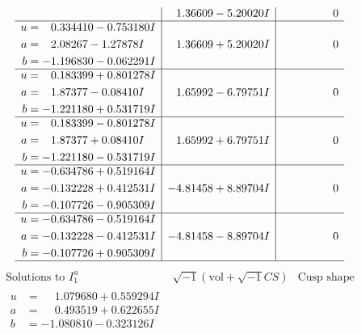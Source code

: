 \documentclass[1p]{elsarticle_modified}
\theoremstyle{definition}
\newcommand{\I}{\sqrt{-1}}
\begin{document}
$$\begin{array}{c|c|c}
 & \phantom{-}1.36609 - 5.20020 I & \phantom{-0.000000 } 0 \\ \hline\begin{aligned}
u &= \phantom{-}0.334410 - 0.753180 I \\
a &= \phantom{-}2.08267 - 1.27878 I \\
b &= -1.196830 - 0.062291 I\end{aligned}
 & \phantom{-}1.36609 + 5.20020 I & \phantom{-0.000000 } 0 \\ \hline\begin{aligned}
u &= \phantom{-}0.183399 + 0.801278 I \\
a &= \phantom{-}1.87377 - 0.08410 I \\
b &= -1.221180 + 0.531719 I\end{aligned}
 & \phantom{-}1.65992 - 6.79751 I & \phantom{-0.000000 } 0 \\ \hline\begin{aligned}
u &= \phantom{-}0.183399 - 0.801278 I \\
a &= \phantom{-}1.87377 + 0.08410 I \\
b &= -1.221180 - 0.531719 I\end{aligned}
 & \phantom{-}1.65992 + 6.79751 I & \phantom{-0.000000 } 0 \\ \hline\begin{aligned}
u &= -0.634786 + 0.519164 I \\
a &= -0.132228 + 0.412531 I \\
b &= -0.107726 - 0.905309 I\end{aligned}
 & -4.81458 + 8.89704 I & \phantom{-0.000000 } 0 \\ \hline\begin{aligned}
u &= -0.634786 - 0.519164 I \\
a &= -0.132228 - 0.412531 I \\
b &= -0.107726 + 0.905309 I\end{aligned}
 & -4.81458 - 8.89704 I & \phantom{-0.000000 } 0\\
 \hline 
 \end{array}$$\newpage$$\begin{array}{c|c|c}  
\text{Solutions to }I^u_{1}& \I (\text{vol} + \sqrt{-1}CS) & \text{Cusp shape}\\
 \hline 
\begin{aligned}
u &= \phantom{-}1.079680 + 0.559294 I \\
a &= \phantom{-}0.493519 + 0.622655 I \\
b &= -1.080810 - 0.323126 I\end{aligned}

\end{array}$$
\end{document}
